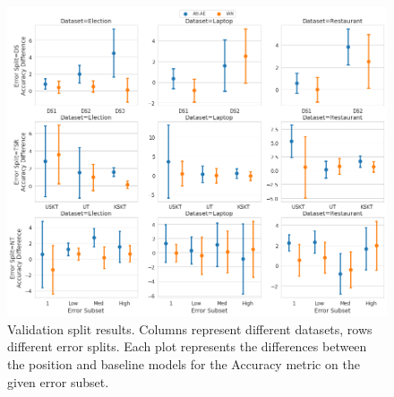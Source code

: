 \begin{figure}[h!]
    \centering
    \includegraphics[scale=0.32]{images/augmentation/methods_performance/Position_Encoding/position_split_difference_validation_results.png}
    \caption{Validation split results. Columns represent different datasets, rows different error splits. Each plot represents the differences between the position and baseline models for the Accuracy metric on the given error subset.}
    \label{fig:aug_position_split_difference_validation_results}
\end{figure}
